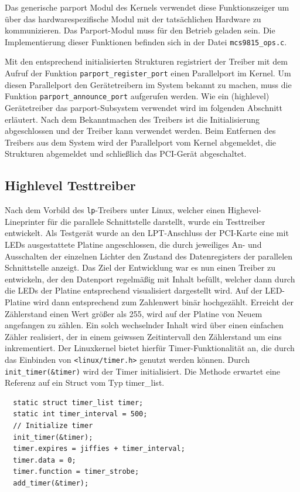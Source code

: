 \documentclass[a4paper,11pt]{article}
\begin{document}
Das generische parport Modul des Kernels verwendet diese Funktionszeiger um über das hardwarespezifische Modul mit 
der tatsächlichen Hardware zu kommunizieren. Das Parport-Modul muss für den Betrieb geladen sein.
Die Implementierung dieser Funktionen befinden sich in der Datei \verb|mcs9815_ops.c|. 

Mit den entsprechend initialisierten Strukturen registriert der Treiber mit dem Aufruf der Funktion \verb|parport_register_port| einen Parallelport im Kernel.
Um diesen Parallelport den Gerätetreibern im System bekannt zu machen, muss die Funktion \verb|parport_announce_port| aufgerufen werden.
Wie ein (highlevel) Gerätetreiber das parport-Subsystem verwendet wird im folgenden Abschnitt erläutert.
Nach dem Bekanntmachen des Treibers ist die Initialisierung abgeschlossen und der Treiber kann verwendet werden.
Beim Entfernen des Treibers aus dem System wird der Parallelport vom Kernel abgemeldet, die Strukturen abgemeldet und schließlich das PCI-Gerät 
abgeschaltet.

\subsection{Highlevel Testtreiber}

Nach dem Vorbild des \verb|lp|-Treibers unter Linux, welcher einen Highevel-Lineprinter für die parallele Schnittstelle darstellt, wurde ein Testtreiber entwickelt. Als Testgerät wurde an den LPT-Anschluss der PCI-Karte eine mit LEDs ausgestattete Platine angeschlossen, die durch jeweiliges An- und Ausschalten der einzelnen Lichter den Zustand des Datenregisters der parallelen Schnittstelle anzeigt. Das Ziel der Entwicklung war es nun einen Treiber zu entwickeln, der den Datenport regelmäßig mit Inhalt befüllt, welcher dann durch die LEDs der Platine entsprechend visualisiert dargestellt wird. Auf der LED-Platine wird dann entsprechend zum Zahlenwert binär hochgezählt. Erreicht der Zählerstand einen Wert größer als 255, wird auf der Platine von Neuem angefangen zu zählen.
Ein solch wechselnder Inhalt wird über einen einfachen Zähler realisiert, der in einem geiwssen Zeitintervall den Zählerstand um eins inkrementiert. Der Linuxkernel bietet hierfür Timer-Funktionalität an, die durch das Einbinden von \verb|<linux/timer.h>| genutzt werden können. Durch \verb|init_timer(&timer)| wird der Timer initialisiert. Die Methode erwartet eine Referenz auf ein Struct vom Typ timer\_list. 
\begin{verbatim}
  static struct timer_list timer;
  static int timer_interval = 500;
  // Initialize timer
  init_timer(&timer);
  timer.expires = jiffies + timer_interval;
  timer.data = 0;
  timer.function = timer_strobe;
  add_timer(&timer);
\end{verbatim}
\end{document}

